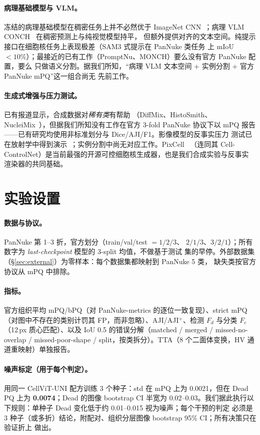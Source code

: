 \documentclass[11pt]{article}
\begin{document}
\paragraph{病理基础模型与 VLM。}冻结的病理基础模型在稠密任务上并不必然优于 ImageNet
CNN~\cite{mindthegap}；病理 VLM CONCH~\cite{lu2024conch} 在稠密预测上与纯视觉模型持平，
但额外提供对齐的文本空间。纯提示接口在细胞核任务上表现极差（SAM3 式提示在 PanNuke 类任务
上 mIoU $<10\%$）；最接近的已有工作（PromptNu、MONCH）要么没有官方 PanNuke 配置，要么
只做语义分割。据我们所知，“病理 VLM 文本空间 + 实例分割 + 官方 PanNuke mPQ”这一组合尚无
先前工作。

\paragraph{生成式增强与压力测试。}已有报道显示，合成数据对\emph{稀有类}有帮助
（DiffMix、HistoSmith、NucleiMix~\cite{nucleimix}），但据我们所知没有工作在官方 3-fold
PanNuke 协议下以 mPQ 报告——已有研究均使用非标准划分与 Dice/AJI/F1。影像模型的反事实压力
测试已在放射学中得到演示~\cite{cfstress}；实例分割中尚无对应工作。PixCell~\cite{le2025pixcell}
（连同其 Cell-ControlNet）是当前最强的开源可控细胞核生成器，也是我们合成实验与反事实
渲染器的共同基础。

\section{实验设置}
\label{sec:setup}

\paragraph{数据与协议。}PanNuke 第 1--3 折，官方划分（train/val/test $=1/2/3$、
$2/1/3$、$3/2/1$）；所有数字为 \emph{last-checkpoint} 模型的 3-split 均值，不做基于测试
集的早停。外部数据集（\S\ref{sec:external}）为零样本：每个数据集都映射到 PanNuke 5 类，
缺失类按官方协议从 mPQ 中排除。

\paragraph{指标。}官方组织平均 mPQ/bPQ（对 PanNuke-metrics 的逐位一致复现）、strict mPQ
（对图中不存在的类别计罚其 FP，而非忽略）、AJI/AJI$^+$、检测 $F_d$ 与分类 $F_c$（12\,px
质心匹配）、以及 IoU 0.5 的错误分解（matched / merged / missed-no-overlap /
missed-poor-shape / split，按类拆分）。TTA（8 个二面体变换，HV 通道重映射）单独报告。

\paragraph{噪声标定（用于每个判定）。}用同一 CellViT-UNI 配方训练 3 个种子：std 在
mPQ 上为 0.0021，但在 Dead PQ 上为 \textbf{0.0074}；Dead 的图像 bootstrap CI 半宽为
0.02--0.03。我们据此执行以下规则：单种子 Dead 变化低于约 0.01--0.015 视为噪声；每个干预的判定
必须是 3 种子（或多折）结论，附配对、组织分层图像 bootstrap 95\% CI；所有决策只在验证折上
做出。
\end{document}
